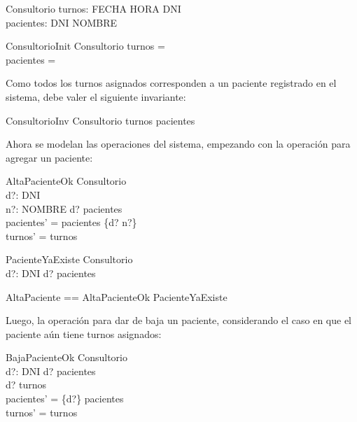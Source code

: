 \documentclass[12pt]{article}
\begin{document}
\begin{schema}{Consultorio}
turnos: FECHA \cross HORA \pfun DNI \\
pacientes: DNI \pfun NOMBRE
\end{schema}

\begin{schema}{ConsultorioInit}
Consultorio
\where
turnos = \emptyset \\
pacientes = \emptyset
\end{schema}

Como todos los turnos asignados corresponden a un paciente registrado en el sistema, debe valer el siguiente invariante:

\begin{schema}{ConsultorioInv}
Consultorio
\where
\ran turnos \subseteq \dom pacientes
\end{schema}

Ahora se modelan las operaciones del sistema, empezando con la operación para agregar un paciente:

\begin{schema}{AltaPacienteOk}
\Delta Consultorio \\
d?: DNI \\
n?: NOMBRE
\where
d? \notin \dom pacientes \\
pacientes' = pacientes \cup \{d? \mapsto n?\} \\
turnos' = turnos
\end{schema}

\begin{schema}{PacienteYaExiste}
\Xi Consultorio \\
d?: DNI
\where
d? \in \dom pacientes
\end{schema}

\begin{zed}
AltaPaciente == AltaPacienteOk \lor PacienteYaExiste
\end{zed}

Luego, la operación para dar de baja un paciente, considerando el caso en que el paciente aún tiene turnos asignados:

\begin{schema}{BajaPacienteOk}
\Delta Consultorio \\
d?: DNI
\where
d? \in \dom pacientes \\
d? \notin \ran turnos \\
pacientes' = \{d?\} \ndres pacientes \\
turnos' = turnos
\end{schema}
\end{document}
